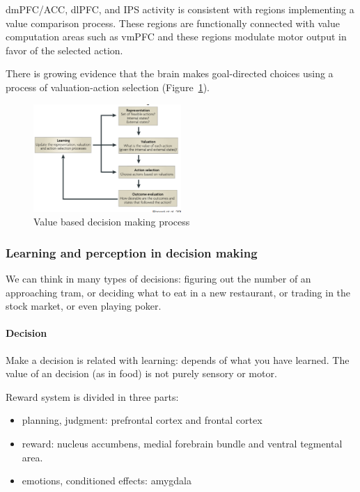 \documentclass[12pt,article,oneside,a4paper]{memoir}
\begin{document}
dmPFC/ACC, dlPFC, and IPS activity is consistent with regions implementing a
value comparison process. These regions are functionally connected with value
computation areas such as vmPFC and these regions modulate motor output in
favor of the selected action.

There is growing evidence that the brain makes goal-directed choices using a
process of valuation-action selection (Figure~\ref{fig:decision-making}).

\begin{figure}
  \centering
  \includegraphics[width=0.5\textwidth]{imgs/value-based-decision-making.png}
  \caption{Value based decision making process}
  \label{fig:decision-making}
\end{figure}

\subsubsection{Learning and perception in decision making}
We can think in many types of decisions: figuring out the number of an
approaching tram, or deciding what to eat in a new restaurant, or trading in
the stock market, or even playing poker.

\paragraph{Decision}
Make a decision is related with learning: depends of what you have learned.
The value of an decision (as in food) is not purely sensory or motor.

Reward system is divided in three parts:
\begin{itemize}
\item planning, judgment: prefrontal cortex and frontal cortex
\item reward: nucleus accumbens, medial forebrain bundle and ventral tegmental
area.
\item emotions, conditioned effects: amygdala
\end{itemize}
\end{document}

